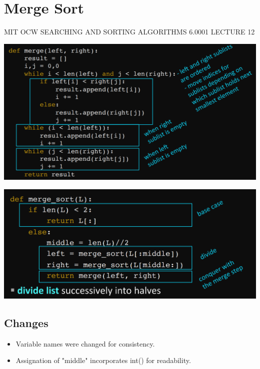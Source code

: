 \documentclass[11pt]{article}
\begin{document}
\section{Merge Sort}
\label{sec:org20e4f5c}
MIT OCW SEARCHING AND SORTING ALGORITHMS 6.0001 LECTURE 12
\begin{center}
\includegraphics[width=.9\linewidth]{./Screenshot 2022-03-16 100339.png}
\end{center}
\begin{center}
\includegraphics[width=.9\linewidth]{./Screenshot 2022-03-16 100418.png}
\end{center}
\subsection{Changes}
\label{sec:orgf45699b}
\begin{itemize}
\item Variable names were changed for consistency.
\item Assignation of "middle" incorporates int() for readability.
\end{itemize}
\end{document}
